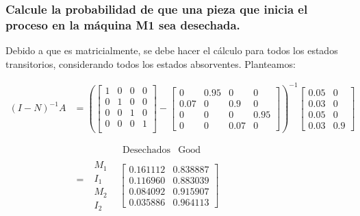 \documentclass[11pt]{article}
\begin{document}
\subsubsection{Calcule la probabilidad de que una pieza que inicia el proceso en la máquina M1 sea desechada.}

Debido a que es matricialmente, se debe hacer el cálculo para todos los estados transitorios, considerando todos los estados absorventes. Planteamos:


\begin{align*}
(I-N)^{-1}A &=  \left(\begin{bmatrix}
1 & 0 & 0 & 0 \\
0 & 1 & 0 & 0 \\
0 & 0 & 1 & 0 \\
0 & 0 & 0 & 1 \\
\end{bmatrix} - \begin{bmatrix}
0 & 0.95 & 0 & 0 \\ 0.07 & 0 & 0.9 & 0 \\ 0 & 0 & 0 & 0.95 \\ 0 & 0 & 0.07 & 0
\end{bmatrix}\right)^{-1} \begin{bmatrix}
0.05  & 0 \\ 0.03 & 0 \\ 0.05 & 0 \\ 0.03 & 0.9
\end{bmatrix}
 \\
 \\
 & = \begin{matrix}  & \begin{matrix}
\text{Desechados} & \text{Good}
\end{matrix} \\
\begin{matrix}
M_{1} \\
I_{1} \\
M_{2} \\
I_{2}
\end{matrix} &  \begin{bmatrix}
0.161112 & 0.838887 \\
0.116960 & 0.883039 \\
0.084092 & 0.915907 \\
0.035886 & 0.964113
\end{bmatrix} \\

\end{matrix}
\end{align*}
\end{document}
